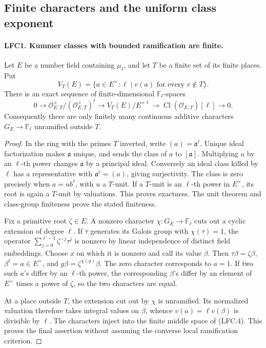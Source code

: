 \subsection{Finite characters and the uniform class exponent}

\paragraph{LFC1. Kummer classes with bounded ramification are finite.}
\label{claim:LFC1}
Let \(E\) be a number field containing \(\mu_\ell\), and let
\(T\) be a finite set of its finite places.  Put
\[
 V_T(E)=\{a\in E^\times:\ell\mid v(a)\text{ for every }v\notin T\}.
\]
There is an exact sequence of finite-dimensional
\(\mathbb F_\ell\)-spaces
\[
 0\longrightarrow
   \mathcal O_{E,T}^{\times}/(\mathcal O_{E,T}^{\times})^\ell
 \longrightarrow V_T(E)/E^{\times\ell}
 \longrightarrow \operatorname{Cl}(\mathcal O_{E,T})[\ell]
 \longrightarrow0.                                     \tag{LFC.4}
\]
Consequently there are only finitely many continuous additive
characters \(G_E\to\mathbb F_\ell\) unramified outside \(T\).

\begin{proof}
In the ring with the primes \(T\) inverted, write
\((a)=\mathfrak a^\ell\).  Unique ideal factorization makes
\(\mathfrak a\) unique, and sends the class of \(a\) to
\([\mathfrak a]\).  Multiplying \(a\) by an \(\ell\)-th power
changes \(\mathfrak a\) by a principal ideal.  Conversely an ideal
class killed by \(\ell\) has a representative with
\(\mathfrak a^\ell=(a)\), giving surjectivity.  The class is zero
precisely when \(a=u b^\ell\), with \(u\) a \(T\)-unit.
If a \(T\)-unit is an \(\ell\)-th power in \(E^\times\),
its root is again a \(T\)-unit by valuations.  This proves
exactness.  The unit theorem and class-group finiteness prove
the stated finiteness.

Fix a primitive root \(\zeta\in E\).  A nonzero character
\(\chi:G_E\to\mathbb F_\ell\) cuts out a cyclic extension of
degree \(\ell\).  If \(\tau\) generates its Galois group with
\(\chi(\tau)=1\), the operator
\(\sum_{j=0}^{\ell-1}\zeta^{-j}\tau^j\) is nonzero by linear
independence of distinct field embeddings.  Choose \(x\) on
which it is nonzero and call its value \(\beta\).
Then \(\tau\beta=\zeta\beta\), \(\beta^\ell=a\in E^\times\),
and \(g\beta=\zeta^{\chi(g)}\beta\).
The zero character corresponds to \(a=1\).  If two such
\(a\)'s differ by an \(\ell\)-th power, the corresponding
\(\beta\)'s differ by an element of \(E^\times\) times a power
of \(\zeta\), so the two characters are equal.

At a place outside \(T\), the extension cut out by \(\chi\)
is unramified.  Its normalized valuation therefore takes integral
values on \(\beta\), whence \(v(a)=\ell v(\beta)\) is divisible
by \(\ell\).  The characters inject into the finite middle
space of (LFC.4).  This proves the final assertion without
assuming the converse local ramification criterion.
\end{proof}

